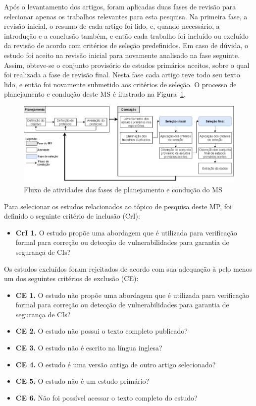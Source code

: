 Após o levantamento dos artigos, foram aplicadas duas fases de revisão para selecionar apenas os trabalhos relevantes para esta pesquisa. Na primeira fase, a revisão inicial, o resumo de cada artigo foi lido, e, quando necessário, a introdução e a conclusão também, e então cada trabalho foi incluído ou excluído da revisão de acordo com critérios de seleção predefinidos. Em caso de dúvida, o estudo foi aceito na revisão inicial para novamente analisado na fase seguinte. Assim, obteve-se o conjunto provisório de estudos primários aceitos, sobre o qual foi realizada a fase de revisão final. Nesta fase cada artigo teve todo seu texto lido, e então foi novamente submetido aos critérios de seleção. O processo de planejamento e condução deste MS é ilustrado na Figura~\ref{fig:ms_fluxo}.

\begin{figure}[!ht]
 \caption{Fluxo de atividades das fases de planejamento e condução do MS}
 \label{fig:ms_fluxo}
 \centering
 \includegraphics[scale=0.5]{figuras/ms_fluxo.png}
 \fautor
\end{figure}

Para selecionar os estudos relacionados ao tópico de pesquisa deste MP, foi definido o seguinte critério de inclusão (CrI):

\begin{itemize}
    \item \textbf{CrI 1.} O estudo propõe uma abordagem que é utilizada para verificação formal para correção ou detecção de vulnerabilidades para garantia de segurança de CIs?
\end{itemize}

Os estudos excluídos foram rejeitados de acordo com sua adequação à pelo menos um dos seguintes critérios de exclusão (CE): 

\begin{itemize}
    \item \textbf{CE 1.} O estudo não propõe uma abordagem que é utilizada para verificação formal para correção ou detecção de vulnerabilidades para garantia de segurança de CIs?
    \item \textbf{CE 2.} O estudo não possui o texto completo publicado?
    \item \textbf{CE 3.} O estudo não é escrito na língua inglesa?
    \item \textbf{CE 4.} O estudo é uma versão antiga de outro artigo selecionado?
    \item \textbf{CE 5.} O estudo não é um estudo primário?
    \item \textbf{CE 6.} Não foi possível acessar o texto completo do estudo?
\end{itemize}

